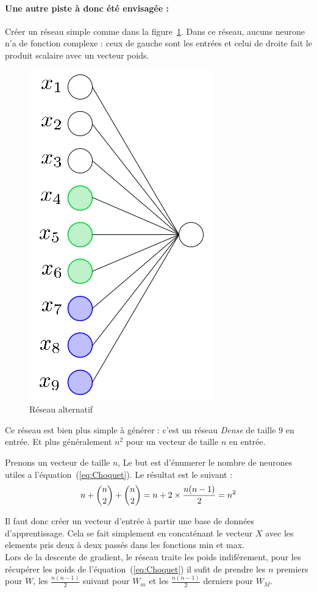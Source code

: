\paragraph{Une autre piste à donc été envisagée :}
Créer un réseau simple comme dans la figure\ \ref{fig:net3}.
Dans ce réseau, aucuns neurone n'a de fonction complexe :
ceux de gauche sont les entrées et
celui de droite fait le produit scalaire avec un vecteur poids.
\begin{figure}[H]
    \center
    \includegraphics[height=\moyen]{pict/net3.png}
	\caption{Réseau alternatif}
	\label{fig:net3}
\end{figure}
\vspace{-12pt}
Ce réseau est bien plus simple à générer : c'est un réseau \emph{Dense} de taille $9$ en entrée.
Et plus généralement $n^2$ pour un vecteur de taille $n$ en entrée.


{
Prenons un vecteur de taille $n$,
Le but est d'énumerer le nombre de neurones utiles a l'équation\ (\ref{eq:Choquet}).
Le résultat est le suivant :
\begin{equation}
    n + \dbinom{n}{2} + \dbinom{n}{2} = n + 2 \times \frac{n(n-1)}{2} = n^2
\end{equation}
}

Il faut donc créer un vecteur d'entrée à partir une base de données d'apprentissage.
Cela se fait simplement en concaténant le vecteur $X$ avec les elements pris deux à deux passés
dans les fonctions min et max.\\


Lors de la descente de gradient, le réseau traite les poids indiférement,
pour les récupérer les poids de l'équation\ (\ref{eq:Choquet})
il sufit de prendre les $n$ premiers pour $W$,
les $\frac{n(n-1)}{2}$ suivant pour $W_m$
et les $\frac{n(n-1)}{2}$ derniers pour $W_M$.
